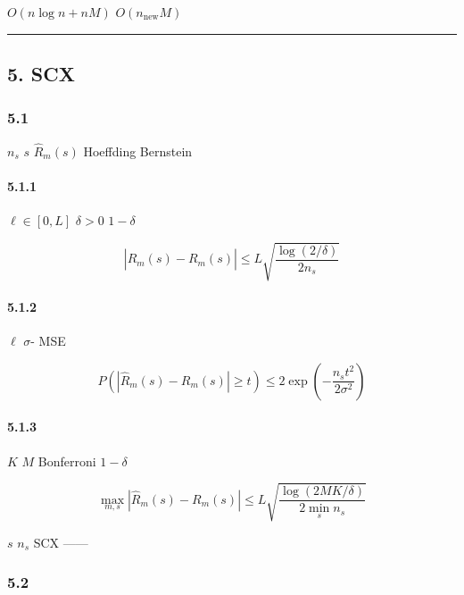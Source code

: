 \documentclass[
  12pt,
]{article}
\begin{document}
\textbf{} \(O(n \log n + n M)\)
\(O(n_{\text{new}} M)\)

\begin{center}\rule{0.5\linewidth}{0.5pt}\end{center}

\subsection{5. SCX }\label{scx-ux7406ux8bbaux8fb9ux754c}

\subsubsection{5.1
}\label{ux6536ux655bux8fb9ux754cux98ceux9669ux4f30ux8ba1ux7684ux4e00ux81f4ux6027}

 \(n_s\)  \(s\) 
\(\hat{R}_m(s)\)  Hoeffding  Bernstein 

\paragraph{5.1.1 }\label{ux6709ux754cux635fux5931}

 \(\ell \in [0, L]\) \(\delta > 0\) \(1 - \delta\)

\[|\hat{R}_m(s) - R_m(s)| \leq L \sqrt{\frac{\log(2/\delta)}{2 n_s}}\]

\paragraph{5.1.2 }\label{ux4e9aux9ad8ux65afux635fux5931}

 \(\ell\)  \(\sigma\)- MSE 

\[P\left(|\hat{R}_m(s) - R_m(s)| \geq t\right) \leq 2 \exp\left(-\frac{n_s t^2}{2\sigma^2}\right)\]

\paragraph{5.1.3
}\label{ux591aux72b6ux6001ux8054ux5408ux8fb9ux754c}

 \(K\)  \(M\)  Bonferroni 
\(1 - \delta\)

\[\max_{m,s} |\hat{R}_m(s) - R_m(s)| \leq L \sqrt{\frac{\log(2MK/\delta)}{2 \min_s n_s}}\]

\textbf{} \(s\)  \(n_s\)
 SCX
------\textbf{}

\subsubsection{5.2
}\label{ux6cdbux5316ux8fb9ux754cux72b6ux6001ux6761ux4ef6ux4e13ux5bb6ux8defux7531}
\end{document}
